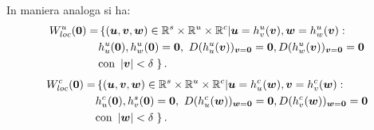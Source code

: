 In maniera analoga si ha:
\[\begin{aligned}
    W_{loc}^u(\v{0}) = &\left\{
	(\v{u}, \v{v}, \v{w}) \in \mathbb{R}^s \times \mathbb{R}^u \times \mathbb{R}^c |
	\v{u} = h_v^u(\v{v}), \v{w}=h_w^u(\v{v}): \right.\\
		       &
			   h_u^u(\v{0}) , h_w^u(\v{0}) = \v{0}, \ D(h_u^u(\v{v}))_{\v{v}=\v{0}} = \v{0}, 
                           D(h_w^u(\v{v}))_{\v{v}=\v{0}} = \v{0} \\
		       & \text{con } \left|\v{v}\right|< \delta
    \left. \right\}
.\end{aligned}\]
\[\begin{aligned}
    W_{loc}^c(\v{0}) = &\left\{
	(\v{u}, \v{v}, \v{w}) \in \mathbb{R}^s \times \mathbb{R}^u \times \mathbb{R}^c |
	\v{u} = h_u^c(\v{w}), \v{v}=h_v^c(\v{w}): \right.\\
		       &
			   h_u^c(\v{0}) , h_v^s(\v{0}) = \v{0}, \ D(h_u^c(\v{w}))_{\v{w}=\v{0}} = \v{0}, 
                           D(h_v^c(\v{w}))_{\v{w}=\v{0}} = \v{0} \\
		       & \text{con } \left|\v{w}\right|< \delta
    \left. \right\}
.\end{aligned}\]
